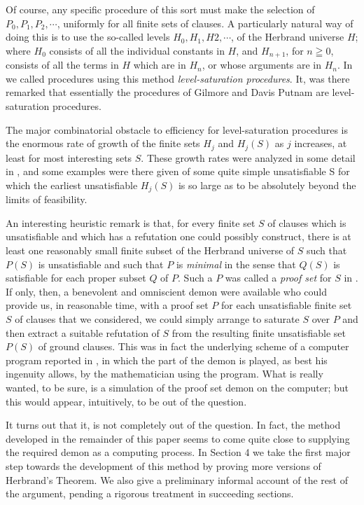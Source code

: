 \documentclass[8pt]{extarticle}
\begin{document}
Of course, any specific procedure of this sort must make the selection of \\$P_0, P_1, P_2,\dotsm$, uniformly for all finite sets of clauses. A  particularly natural way of doing this is to use the so-called levels $H_0, H_1, H2,\dotsm$, of the Herbrand universe $H$; where $H_0$ consists of all the individual constants in $H$, and $H_{n+1}$, for $n\geqq0$, consists of all the terms in $H$ which are in $H_n$, or whose arguments are in $H_n$. In \cite{robinson_1963} we called procedures using this method \emph{level-saturation procedures}. It, was there remarked that essentially the procedures of Gilmore \cite{gilmore_1960} and Davis Putnam \cite{davis_1960} are level-saturation procedures. 

The major combinatorial obstacle to efficiency for level-saturation procedures is the enormous rate of growth of the finite sets $H_j$ and $H_j(S)$ as $j$ increases, at least for most interesting sets $S$. These growth rates were analyzed in some detail in \cite{robinson_1963}, and some examples were there given of some quite simple unsatisfiable S for which the earliest unsatisfiable  $H_j(S)$ is so large as to be absolutely beyond the limits of feasibility.

An interesting heuristic remark is that, for every finite set $S$ of clauses which is unsatisfiable and which has a refutation one could possibly construct, there is at least one reasonably small finite subset of the Herbrand universe of $S$ such that $P(S)$ is unsatisfiable and such that $P$ is \emph{minimal} in the sense that $Q(S)$ is satisfiable for each proper subset $Q$ of $P$. Such a $P$ was called a \emph{proof set} for $S$ in \cite{robinson_1963}. If only, then, a benevolent and omniscient demon were available who could provide us, in reasonable time, with a proof set $P$ for each unsatisfiable finite set $S$ of clauses that we considered, we could simply arrange to saturate $S$ over $P$ and then extract a suitable refutation of $S$ from the resulting finite unsatisfiable set $P(S)$ of ground clauses. This was in fact the underlying scheme of a computer program reported in \cite{robinson_1963}, in which the part of the demon is played, as best his ingenuity allows, by the mathematician using the program. What is really wanted, to be sure, is a simulation of the proof set demon on the computer; but this would appear, intuitively, to be out of the question.

It turns out that it, is not completely out of the question. In fact, the method developed in the remainder of this paper seems to come quite close to supplying the required demon as a computing process. In Section 4 we take the first major step towards the development of this method by proving more versions of Herbrand's Theorem. We also give a preliminary informal account of the rest of the argument, pending a rigorous treatment in succeeding sections.
\end{document}
